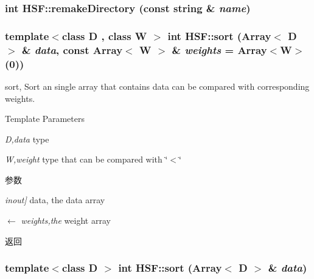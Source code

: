 \label{namespaceHSF_a6b9d255d6786f77b964d5963b79726c4}
\hypertarget{namespaceHSF_a421eadc73c19fbad2ebf9c62192d8733}{
\subsubsection[{remakeDirectory}]{\setlength{\rightskip}{0pt plus 5cm}int HSF::remakeDirectory (const string \& {\em name})}}
\label{namespaceHSF_a421eadc73c19fbad2ebf9c62192d8733}
\hypertarget{namespaceHSF_a31d056485ae50f601fdaa21322907005}{
\subsubsection[{sort}]{\setlength{\rightskip}{0pt plus 5cm}template$<$class D , class W $>$ int HSF::sort (Array$<$ D $>$ \& {\em data}, \/  const Array$<$ W $>$ \& {\em weights} = {\ttfamily Array$<$W$>$(0)})}}
\label{namespaceHSF_a31d056485ae50f601fdaa21322907005}


sort, Sort an single array that contains data can be compared with corresponding weights. 
\begin{DoxyTemplParams}{Template Parameters}
\item[{\em D,data}]type \item[{\em W,weight}]type that can be compared with \char`\"{}$<$\char`\"{} \end{DoxyTemplParams}

\begin{DoxyParams}{参数}
\item[{\em inout\mbox{]}}]data, the data array \item[\mbox{$\leftarrow$} {\em weights,the}]weight array \end{DoxyParams}
\begin{DoxyReturn}{返回}

\end{DoxyReturn}
\hypertarget{namespaceHSF_a6dc2998ec8bb64efa0517dde5f8ab74a}{
\subsubsection[{sort}]{\setlength{\rightskip}{0pt plus 5cm}template$<$class D $>$ int HSF::sort (Array$<$ D $>$ \& {\em data})}}
\label{namespaceHSF_a6dc2998ec8bb64efa0517dde5f8ab74a}


